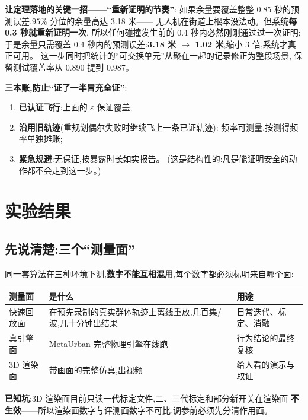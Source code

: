 \documentclass[11pt]{ctexart}
\begin{document}
\textbf{让定理落地的关键一招——``重新证明的节奏''}:
如果余量要覆盖整整 0.85 秒的预测误差,$95\%$ 分位的余量高达 3.18 米——
无人机在街道上根本没法动。但系统\textbf{每 0.3 秒就重新证明一次},
所以任何碰撞发生前的 0.4 秒内必然刚刚通过过一次证明;于是余量只需覆盖
0.4 秒内的预测误差:\textbf{3.18 米 $\to$ 1.02 米},缩小 3 倍,系统才真正可用。
这一步同时把统计的``可交换单元''从聚在一起的记录修正为整段场景,
保留测试覆盖率从 $0.890$ 提到 $0.987$。

\textbf{三本账,防止``证了一半冒充全证''}:
\begin{enumerate}
  \item \textbf{已认证飞行}:上面的 $\varepsilon$ 保证覆盖;
  \item \textbf{沿用旧轨迹}(重规划偶尔失败时继续飞上一条已证轨迹):
        频率可测量,按测得频率单独摊账;
  \item \textbf{紧急规避}:无保证,按暴露时长如实报告。
        (这是结构性的:凡是能证明安全的动作都不会走到这一步。)
\end{enumerate}

\section{实验结果}\label{sec:results}

\subsection{先说清楚:三个``测量面''}\label{sec:surfaces}

同一套算法在三种环境下测,\textbf{数字不能互相混用},每个数字都必须标明来自哪个面:

\begin{center}
\begin{tabular}{@{}p{3.2cm}p{6.2cm}p{4.6cm}@{}}
\toprule
测量面 & 是什么 & 用途 \\
\midrule
快速回放面 & 在预先录制的真实群体轨迹上离线重放,几百集/波,几十分钟出结果 & 日常迭代、标定、消融 \\
真引擎面 & MetaUrban 完整物理引擎在线跑 & 行为结论的最终复核 \\
3D 渲染面 & 带画面的完整仿真,出视频 & 给人看的演示与取证 \\
\bottomrule
\end{tabular}
\end{center}

\textbf{已知坑}:3D 渲染面目前只读一代标定文件,二、三代标定和部分新开关在渲染面
\textbf{不生效}——所以渲染面数字与评测面数字不可比,调参前必须先分清作用面。
\end{document}
